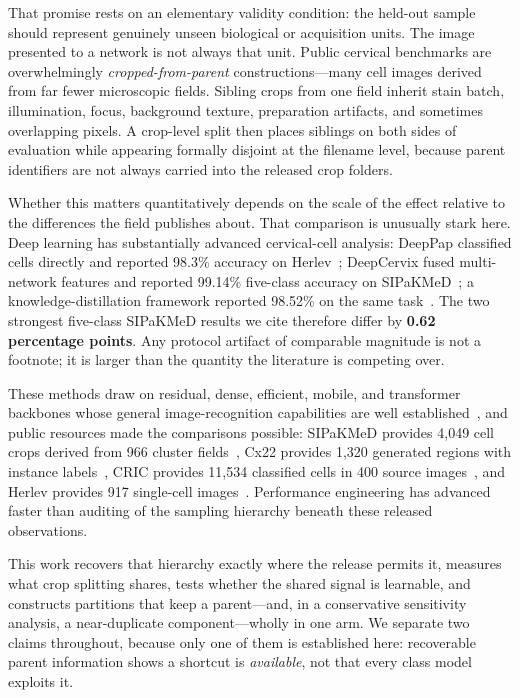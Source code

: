 \documentclass[conference]{IEEEtran}
\begin{document}
That promise rests on an elementary validity condition: the held-out sample should represent genuinely unseen biological or acquisition units.
The image presented to a network is not always that unit.
Public cervical benchmarks are overwhelmingly \emph{cropped-from-parent} constructions---many cell images derived from far fewer microscopic fields.
Sibling crops from one field inherit stain batch, illumination, focus, background texture, preparation artifacts, and sometimes overlapping pixels.
A crop-level split then places siblings on both sides of evaluation while appearing formally disjoint at the filename level, because parent identifiers are not always carried into the released crop folders.

Whether this matters quantitatively depends on the scale of the effect relative to the differences the field publishes about.
That comparison is unusually stark here.
Deep learning has substantially advanced cervical-cell analysis: DeepPap classified cells directly and reported 98.3\% accuracy on Herlev~\cite{zhang2017deeppap}; DeepCervix fused multi-network features and reported 99.14\% five-class accuracy on SIPaKMeD~\cite{rahaman2021deepcervix}; a knowledge-distillation framework reported 98.52\% on the same task~\cite{gao2022knowledge}.
The two strongest five-class SIPaKMeD results we cite therefore differ by \textbf{0.62 percentage points}.
Any protocol artifact of comparable magnitude is not a footnote; it is larger than the quantity the literature is competing over.

These methods draw on residual, dense, efficient, mobile, and transformer backbones whose general image-recognition capabilities are well established~\cite{he2016resnet,huang2017densenet,sandler2018mobilenetv2,tan2019efficientnet,dosovitskiy2021vit}, and public resources made the comparisons possible: SIPaKMeD provides 4,049 cell crops derived from 966 cluster fields~\cite{plissiti2018sipakmed}, Cx22 provides 1,320 generated regions with instance labels~\cite{liu2022cx22}, CRIC provides 11,534 classified cells in 400 source images~\cite{rezende2021cric}, and Herlev provides 917 single-cell images~\cite{jantzen2005pap}.
Performance engineering has advanced faster than auditing of the sampling hierarchy beneath these released observations.

This work recovers that hierarchy exactly where the release permits it, measures what crop splitting shares, tests whether the shared signal is learnable, and constructs partitions that keep a parent---and, in a conservative sensitivity analysis, a near-duplicate component---wholly in one arm.
We separate two claims throughout, because only one of them is established here: recoverable parent information shows a shortcut is \emph{available}, not that every class model exploits it.
\end{document}
